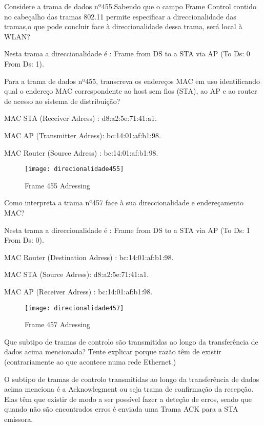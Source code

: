 \documentclass{exam}
\begin{document}
\begin{questions}

\question Considere a trama de dados nº455.Sabendo que o campo Frame Control contido no cabeçalho das tramas 802.11 permite especificar a direccionalidade das tramas,o que pode concluir face à direccionalidade dessa trama, será local à WLAN?
\begin{solution}
Nesta trama a direccionalidade é :
Frame from DS to a STA via AP (To Ds: 0 From Ds: 1).
\end{solution}

\question Para a trama de dados nº455, transcreva os endereços MAC em uso identificando qual o endereço MAC correspondente ao host sem fios (STA), ao AP e ao router de acesso ao sistema de distribuição?
\begin{solution}

MAC STA (Receiver Adress)  : d8:a2:5e:71:41:a1.

MAC AP (Transmitter Adress): bc:14:01:af:b1:98.

MAC Router (Source Adress) : bc:14:01:af:b1:98.

\end{solution}
\begin{figure}[H]
\centering\texttt{[image: direcionalidade455]} 
\caption{\label{fig:controller}Frame 455 Adressing}
\end{figure}


\question Como interpreta a trama nº457 face à sua direccionalidade e endereçamento MAC?
\begin{solution}
Nesta trama a direccionalidade é :
Frame from DS to a STA via AP (To Ds: 1 From Ds: 0).


MAC Router (Destination Adress)  : bc:14:01:af:b1:98.

MAC STA (Source Adress): d8:a2:5e:71:41:a1.

MAC AP (Receiver Adress) : bc:14:01:af:b1:98.
\end{solution}

\begin{figure}[H]
\centering\texttt{[image: direcionalidade457]} 
\caption{\label{fig:controller}Frame 457 Adressing}
\end{figure}


\question Que subtipo de tramas de controlo são transmitidas ao longo da transferência de dados acima mencionada? Tente explicar porque razão têm de existir (contrariamente ao que acontece numa rede Ethernet.)
\begin{solution}
O subtipo de tramas de controlo transmitidas ao longo da transferência de dados acima menciona é a Acknowlegment ou seja trama de confirmação da recepção.
Elas têm que existir de modo a ser possível fazer a deteção de erros, sendo que quando não são encontrados erros é enviada uma Trama ACK para a STA emissora.
\end{solution}


\end{questions}
\end{document}
